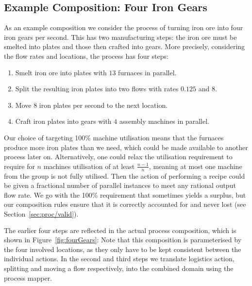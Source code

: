 \documentclass[class=smolathesis,crop=false]{standalone}
\begin{document}
\subsection{Example Composition: Four Iron Gears}
\label{sec:cases/factorio/gears}

As an example composition we consider the process of turning iron ore into four iron gears per second.
This has two manufacturing steps: the iron ore must be smelted into plates and those then crafted into gears.
More precisely, considering the flow rates and locations, the process has four steps:
\begin{enumerate}
  \item Smelt iron ore into plates with $13$ furnaces in parallel.
  \item Split the resulting iron plates into two flows with rates $0.125$ and $8$.
  \item Move $8$ iron plates per second to the next location.
  \item Craft iron plates into gears with $4$ assembly machines in parallel.
\end{enumerate}

Our choice of targeting 100\% machine utilisation means that the furnaces produce more iron plates than we need, which could be made available to another process later on.
Alternatively, one could relax the utilisation requirement to require for $n$ machines utilisation of at least $\frac{n - 1}{n}$, meaning at most one machine from the group is not fully utilised.
Then the action of performing a recipe could be given a fractional number of parallel instances to meet any rational output flow rate.
We go with the 100\% requirement that sometimes yields a surplus, but our composition rules ensure that it is correctly accounted for and never lost (see Section~\ref{sec:proc/valid}).

The earlier four steps are reflected in the actual process composition, which is shown in Figure~\ref{fig:fourGears}:
Note that this composition is parameterised by the four involved locations, as they only have to be kept consistent between the individual actions.
In the second and third steps we translate logistics action, splitting and moving a flow respectively, into the combined domain using the process mapper.
\end{document}
